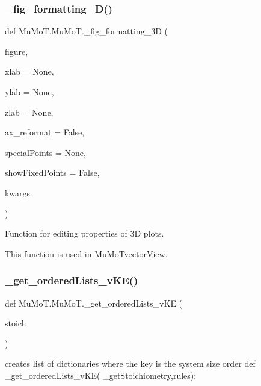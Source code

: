 \subsubsection{\texorpdfstring{\+\_\+fig\+\_\+formatting\+\_\+D()}{\_fig\_formatting\_3D()}}
{\footnotesize\ttfamily def Mu\+Mo\+T.\+Mu\+Mo\+T.\+\_\+fig\+\_\+formatting\+\_\+3D (\begin{DoxyParamCaption}\item[{}]{figure,  }\item[{}]{xlab = {\ttfamily None},  }\item[{}]{ylab = {\ttfamily None},  }\item[{}]{zlab = {\ttfamily None},  }\item[{}]{ax\+\_\+reformat = {\ttfamily False},  }\item[{}]{special\+Points = {\ttfamily None},  }\item[{}]{show\+Fixed\+Points = {\ttfamily False},  }\item[{}]{kwargs }\end{DoxyParamCaption})\hspace{0.3cm}{\ttfamily [private]}}



Function for editing properties of 3D plots. 

This function is used in \hyperlink{class_mu_mo_t_1_1_mu_mo_t_1_1_mu_mo_tvector_view}{Mu\+Mo\+Tvector\+View}. \mbox{\label{namespace_mu_mo_t_1_1_mu_mo_t_aa4d9e72bb9834df8dc09115a251c1973}} 
\subsubsection{\texorpdfstring{\+\_\+get\+\_\+ordered\+Lists\+\_\+v\+K\+E()}{\_get\_orderedLists\_vKE()}}
{\footnotesize\ttfamily def Mu\+Mo\+T.\+Mu\+Mo\+T.\+\_\+get\+\_\+ordered\+Lists\+\_\+v\+KE (\begin{DoxyParamCaption}\item[{}]{stoich }\end{DoxyParamCaption})\hspace{0.3cm}{\ttfamily [private]}}



creates list of dictionaries where the key is the system size order def \+\_\+get\+\_\+ordered\+Lists\+\_\+v\+K\+E( \+\_\+get\+Stoichiometry,rules)\+: 

